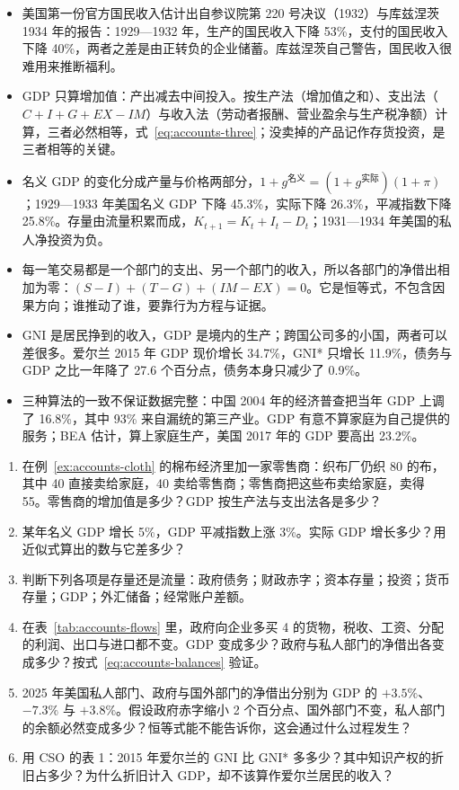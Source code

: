 \begin{takeaways}
\begin{itemize}
\item 美国第一份官方国民收入估计出自参议院第 220 号决议（1932）与库兹涅茨 1934 年的报告：1929—1932 年，生产的国民收入下降 53\%，支付的国民收入下降 40\%，两者之差是由正转负的企业储蓄。库兹涅茨自己警告，国民收入很难用来推断福利。
\item GDP 只算增加值：产出减去中间投入。按生产法（增加值之和）、支出法（$C+I+G+\mathit{EX}-\mathit{IM}$）与收入法（劳动者报酬、营业盈余与生产税净额）计算，三者必然相等，式~\eqref{eq:accounts-three}；没卖掉的产品记作存货投资，是三者相等的关键。
\item 名义 GDP 的变化分成产量与价格两部分，$1+g^{\text{名义}}=(1+g^{\text{实际}})(1+\pi)$；1929—1933 年美国名义 GDP 下降 45.3\%，实际下降 26.3\%，平减指数下降 25.8\%。存量由流量积累而成，$K_{t+1}=K_t+I_t-D_t$；1931—1934 年美国的私人净投资为负。
\item 每一笔交易都是一个部门的支出、另一个部门的收入，所以各部门的净借出相加为零：$(S-I)+(T-G)+(\mathit{IM}-\mathit{EX})=0$。它是恒等式，不包含因果方向；谁推动了谁，要靠行为方程与证据。
\item GNI 是居民挣到的收入，GDP 是境内的生产；跨国公司多的小国，两者可以差很多。爱尔兰 2015 年 GDP 现价增长 34.7\%，GNI* 只增长 11.9\%，债务与 GDP 之比一年降了 27.6 个百分点，债务本身只减少了 0.9\%。
\item 三种算法的一致不保证数据完整：中国 2004 年的经济普查把当年 GDP 上调了 16.8\%，其中 93\% 来自漏统的第三产业。GDP 有意不算家庭为自己提供的服务；BEA 估计，算上家庭生产，美国 2017 年的 GDP 要高出 23.2\%。
\end{itemize}
\end{takeaways}

\begin{selfcheck}
\begin{enumerate}
\item 在例~\ref{ex:accounts-cloth} 的棉布经济里加一家零售商：织布厂仍织 80 的布，其中 40 直接卖给家庭，40 卖给零售商；零售商把这些布卖给家庭，卖得 55。零售商的增加值是多少？GDP 按生产法与支出法各是多少？
\item 某年名义 GDP 增长 5\%，GDP 平减指数上涨 3\%。实际 GDP 增长多少？用近似式算出的数与它差多少？
\item 判断下列各项是存量还是流量：政府债务；财政赤字；资本存量；投资；货币存量；GDP；外汇储备；经常账户差额。
\item 在表~\ref{tab:accounts-flows} 里，政府向企业多买 4 的货物，税收、工资、分配的利润、出口与进口都不变。GDP 变成多少？政府与私人部门的净借出各变成多少？按式~\eqref{eq:accounts-balances} 验证。
\item 2025 年美国私人部门、政府与国外部门的净借出分别为 GDP 的 $+3.5\%$、$-7.3\%$ 与 $+3.8\%$。假设政府赤字缩小 2 个百分点、国外部门不变，私人部门的余额必然变成多少？恒等式能不能告诉你，这会通过什么过程发生？
\item 用 CSO 的表 1：2015 年爱尔兰的 GNI 比 GNI* 多多少？其中知识产权的折旧占多少？为什么折旧计入 GDP，却不该算作爱尔兰居民的收入？
\end{enumerate}
\end{selfcheck}

